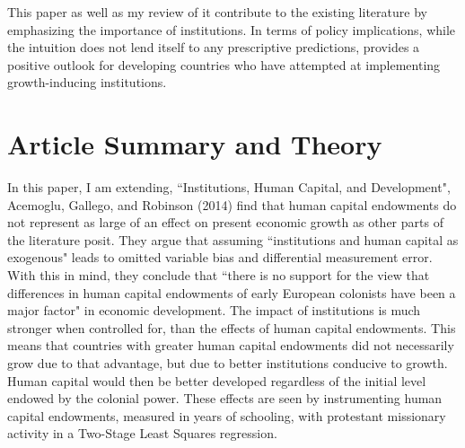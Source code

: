 \documentclass[12pt]{article}
\begin{document}
{This paper as well as my review of it contribute to the existing literature by emphasizing the importance of institutions. In terms of policy implications, while the intuition does not lend itself to any prescriptive predictions, provides a positive outlook for developing countries who have attempted at implementing growth-inducing institutions.\pagebreak

\section{Article Summary and Theory}

\hspace{\parindent} In this paper, I am extending, ``Institutions, Human Capital, and Development", Acemoglu, Gallego, and Robinson (2014) find that human capital endowments do not represent as large of an effect on present economic growth as other parts of the literature posit. They argue that assuming ``institutions and human capital as exogenous" leads to omitted variable bias and differential measurement error. With this in mind, they conclude that ``there is no support for the view that differences in human capital endowments of early European colonists have been a major factor" in economic development.  The impact of institutions is much stronger when controlled for, than the effects of human capital endowments. This means that countries with greater human capital endowments did not necessarily grow due to that advantage, but due to better institutions conducive to growth. Human capital would then be better developed regardless of the initial level endowed by the colonial power. These effects are seen by instrumenting human capital endowments, measured in years of schooling, with protestant missionary activity in a Two-Stage Least Squares regression.\\


}
\end{document}

